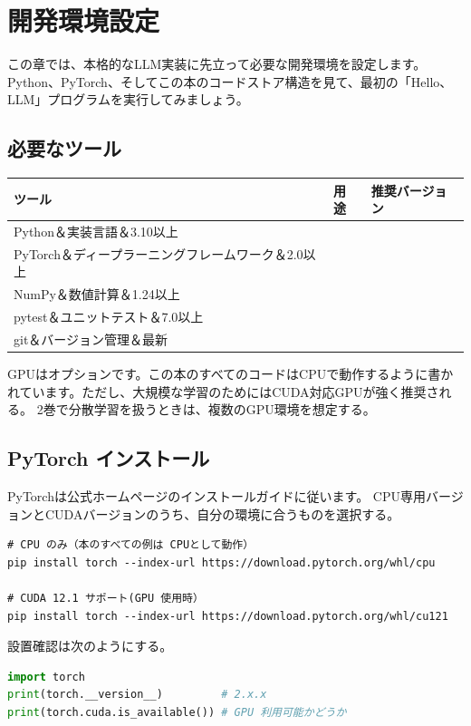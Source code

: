 \chapter{開発環境設定}
\label{ch:setup}

この章では、本格的なLLM実装に先立って必要な開発環境を設定します。 Python、PyTorch、そしてこの本のコードストア構造を見て、最初の「Hello、LLM」プログラムを実行してみましょう。

\section{必要なツール}

\begin{center}
\begin{tabularx}{\textwidth}{lXl}
\toprule
\textbf{ツール}&\textbf{用途}&\textbf{推奨バージョン}\\
\midrule
Python＆実装言語＆3.10以上\\
PyTorch＆ディープラーニングフレームワーク＆2.0以上\\
NumPy＆数値計算＆1.24以上\\
pytest＆ユニットテスト＆7.0以上\\
git＆バージョン管理＆最新\\
\bottomrule
\end{tabularx}
\end{center}

GPUはオプションです。この本のすべてのコードはCPUで動作するように書かれています。ただし、大規模な学習のためにはCUDA対応GPUが強く推奨される。 2巻で分散学習を扱うときは、複数のGPU環境を想定する。

\section{PyTorch インストール}

PyTorchは公式ホームページのインストールガイドに従います。 CPU専用バージョンとCUDAバージョンのうち、自分の環境に合うものを選択する。

\begin{lstlisting}[style=bashstyle]
# CPU のみ（本のすべての例は CPUとして動作）
pip install torch --index-url https://download.pytorch.org/whl/cpu

# CUDA 12.1 サポート(GPU 使用時）
pip install torch --index-url https://download.pytorch.org/whl/cu121
\end{lstlisting}

設置確認は次のようにする。

\begin{lstlisting}[language=Python]
import torch
print(torch.__version__)         # 2.x.x
print(torch.cuda.is_available()) # GPU 利用可能かどうか
\end{lstlisting}

